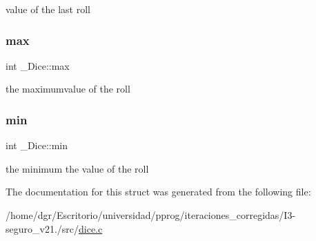 value of the last roll \mbox{\label{struct__Dice_a2895744914ba9458e96cb7c043c5c1ef}} 
\subsubsection{\texorpdfstring{max}{max}}
{\footnotesize\ttfamily int \+\_\+\+Dice\+::max}

the maximumvalue of the roll \mbox{\label{struct__Dice_a75fd8560afa02172adfe8ac33ca73827}} 
\subsubsection{\texorpdfstring{min}{min}}
{\footnotesize\ttfamily int \+\_\+\+Dice\+::min}

the minimum the value of the roll 

The documentation for this struct was generated from the following file\+:\begin{DoxyCompactItemize}
\item 
/home/dgr/\+Escritorio/universidad/pprog/iteraciones\+\_\+corregidas/\+I3-\/seguro\+\_\+v21./src/\hyperlink{dice_8c}{dice.\+c}\end{DoxyCompactItemize}
